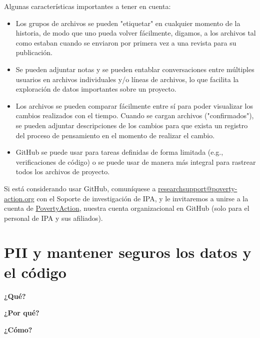 \documentclass[11pt,en]{elegantpaper}
\begin{document}
\begin{itemize}
Algunas características importantes a tener en cuenta:

\begin{itemize}
	\item Los grupos de archivos se pueden "etiquetar" en cualquier momento de la historia, de modo que uno pueda volver fácilmente, digamos, a los archivos tal como estaban cuando se enviaron por primera vez a una revista para su publicación.
	
	\item Se pueden adjuntar notas y se pueden entablar conversaciones entre múltiples usuarios en archivos individuales y/o líneas de archivos, lo que facilita la exploración de datos importantes sobre un proyecto.
	
	\item Los archivos se pueden comparar fácilmente entre sí para poder visualizar los cambios realizados con el tiempo. Cuando se cargan archivos ("confirmados"), se pueden adjuntar descripciones de los cambios para que exista un registro del proceso de pensamiento en el momento de realizar el cambio.
	
	\item GitHub se puede usar para tareas definidas de forma limitada (e.g., verificaciones de código) o se puede usar de manera más integral para rastrear todos los archivos de proyecto.
\end{itemize}

Si está considerando usar GitHub, comuníquese a \href{mailto:researchsupport@poverty-action.org}{researchsupport@poverty-action.org} con el Soporte de investigación de IPA, y le invitaremos a unirse a la cuenta de \href{https://github.com/PovertyAction}{PovertyAction}, nuestra cuenta organizacional en GitHub (solo para el personal de IPA y sus afiliados).

\newpage 
\section{PII y mantener seguros los datos y el código}
\label{sec:pii}

\textbf{¿Qué?}


\textbf{¿Por qué?}


\textbf{¿Cómo?} 

\newpage 
\appendix 

\end{itemize}
\end{document}
